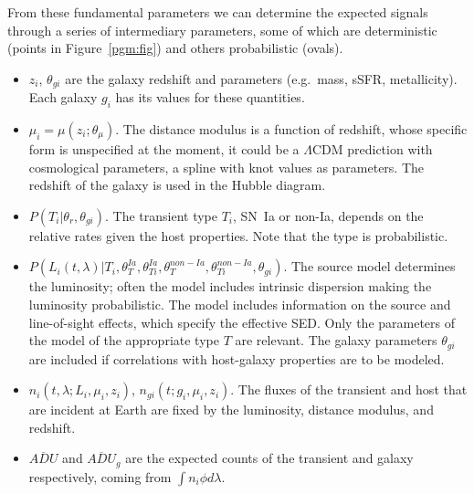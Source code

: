 \documentclass[preprint]{aastex}
\begin{document}
From these fundamental parameters we can determine the expected
signals
through a series of intermediary parameters,
some of which are deterministic (points in Figure~\ref{pgm:fig}) and others
probabilistic (ovals).
\begin{itemize}
\item $z_i$, $\theta_{gi}$ are the galaxy redshift and parameters (e.g.\ mass, sSFR, metallicity).
Each galaxy $g_i$ has its values for these quantities.
\item $\mu_i=\mu(z_i; \theta_\mu)$.  The distance modulus is a function of redshift,
whose specific form is unspecified at the moment,  it could
be a $\Lambda$CDM prediction with cosmological parameters, a spline with knot values
as parameters.
The redshift of the galaxy is used in the Hubble diagram.
\item $P(T_i | \theta_r, \theta_{gi})$.  The transient type $T_i$, SN~Ia or non-Ia, depends
on the relative rates given the host properties.  Note that the type is probabilistic.
\item $P(L_i(t,\lambda)| T_i, \theta_T^{Ia}, \theta_{Ti}^{Ia}, \theta_T^{non-Ia}, \theta_{Ti}^{non-Ia},
\theta_{gi})$.  The source model determines
the luminosity; often the model includes intrinsic dispersion making the luminosity
probabilistic. The  model includes  information on the
source and line-of-sight effects, which specify the effective SED.   Only the
parameters of the model of the appropriate type $T$ are relevant.  The galaxy parameters
$\theta_{gi}$ are included if correlations with host-galaxy properties are to be modeled.
\item $n_i(t,\lambda; L_i, \mu_i, z_i)$, $n_{gi}(t; g_i, \mu_i, z_i)$.  The  fluxes of
the transient and host that are incident at Earth
are fixed by the luminosity, distance modulus, and redshift.
\item $\overline{\mathit{ADU}}$ and
$\overline{\mathit{ADU}}_g$ are the expected counts of the transient and galaxy respectively,
coming from $\int n_i \phi d\lambda$.
\end{itemize}
\end{document}
